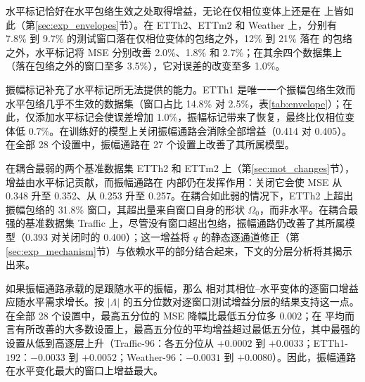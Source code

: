 {
水平标记恰好在水平包络生效之处取得增益，无论在仅相位变体上还是在 \sysplus 上皆如此（第\ref{sec:exp_envelopes}节）。在 ETTh2、ETTm2 和 Weather 上，分别有 7.8\% 到 9.7\% 的测试窗口落在仅相位变体的包络之外，12\% 到 21\% 落在 \sysplus 的包络之外，水平标记将 MSE 分别改善 2.0\%、1.8\% 和 2.7\%；在其余四个数据集上（落在包络之外的窗口至多 3.5\%），它对误差的改变至多 1.0\%。

振幅标记补充了水平标记所无法提供的能力。ETTh1 是唯一一个振幅包络生效而水平包络几乎不生效的数据集（窗口占比 14.8\% 对 2.5\%，表\ref{tab:envelope}）；在此，仅添加水平标记会使误差增加 1.0\%，振幅标记带来了恢复，\sysplus 最终比仅相位变体低 0.7\%。在训练好的模型上关闭振幅通路会消除全部增益（0.414 对 0.405）。在全部 28 个设置中，振幅通路在 27 个设置上改善了其所属模型。

在耦合最弱的两个基准数据集 ETTh2 和 ETTm2 上（第\ref{sec:mot_changes}节），增益由水平标记贡献，而振幅通路在 \sysplus 内部仍在发挥作用：关闭它会使 MSE 从 0.348 升至 0.352、从 0.253 升至 0.257。在耦合如此弱的情况下，ETTh2 上超出振幅包络的 31.8\% 窗口，其超出量来自窗口自身的形状 $\Omega_0$，而非水平。在耦合最强的基准数据集 Traffic 上，尽管没有窗口超出包络，振幅通路仍改善了其所属模型（0.393 对关闭时的 0.400）；这一增益将 $q$ 的静态逐通道修正（第\ref{sec:exp_mechanism}节）与依赖水平的部分结合起来，下文的分层分析将其揭示出来。

如果振幅通路承载的是跟随水平的振幅，那么 \sysplus 相对其相位–水平变体的逐窗口增益应随水平需求增长。按 $|\Lambda|$ 的五分位数对逐窗口测试增益分层的结果支持这一点。在全部 28 个设置中，最高五分位的 MSE 降幅比最低五分位多 $0.002$；在 \sysplus 平均而言有所改善的大多数设置上，最高五分位的平均增益超过最低五分位，其中最强的设置从低到高逐层上升（Traffic-$96$：各五分位从 $+0.0002$ 到 $+0.0033$；ETTh1-$192$：$-0.0033$ 到 $+0.0052$；Weather-$96$：$-0.0031$ 到 $+0.0080$）。因此，振幅通路在水平变化最大的窗口上增益最大。
}

